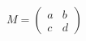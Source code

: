 \documentclass[preview]{standalone}
\begin{document}
\begin{align*}
M = \begin{pmatrix} a & b \\ c & d \end{pmatrix}
\end{align*}
\end{document}
